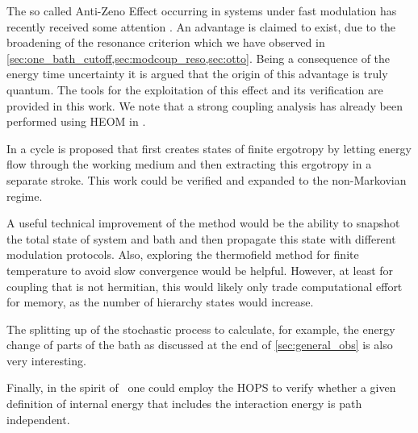 The so called Anti-Zeno Effect occurring in systems under fast
modulation has recently received some attention
\cite{Mukherjee2020Jan,Xu2022Mar}. An advantage is claimed to exist,
due to the broadening of the resonance criterion which we have
observed in
\cref{sec:one_bath_cutoff,sec:modcoup_reso,sec:otto}. Being a
consequence of the energy time uncertainty it is argued that the
origin of this advantage is truly quantum. The tools for the
exploitation of this effect and its verification are provided in this
work. We note that a strong coupling analysis has already been
performed using HEOM in .

In  a cycle is proposed that first creates states
of finite ergotropy by letting energy flow through the working medium
and then extracting this ergotropy in a separate stroke. This work
could be verified and expanded to the non-Markovian regime.

A useful technical improvement of the method would be the ability to
snapshot the total state of system and bath and then propagate this
state with different modulation protocols. Also, exploring the
thermofield method for finite temperature to avoid slow convergence
would be helpful. However, at least for coupling that is not
hermitian, this would likely only trade computational effort for
memory, as the number of hierarchy states would increase.

The splitting up of the stochastic process to calculate, for example, the
energy change of parts of the bath as discussed at the end of
\cref{sec:general_obs} is also very interesting.

Finally, in the spirit of~\cite{Esposito2015Dec} one could employ the
HOPS to verify whether a given definition of internal energy that
includes the interaction energy is path independent.
